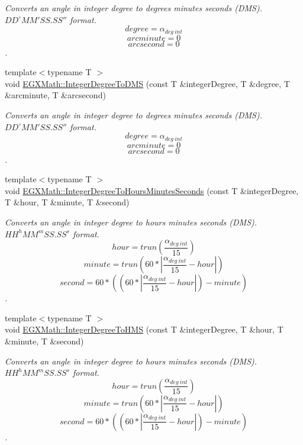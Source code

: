 \begin{DoxyCompactItemize}
\begin{DoxyCompactList}\small\item\em Converts an angle in integer degree to degrees minutes seconds (D\+MS). ${DD}^{\circ}{MM}'{SS.SS}''$ format. \[degree=\alpha_{deg\ int}\] \[arcminute= 0\] \[arcsecond= 0\]. \end{DoxyCompactList}\item 
{\footnotesize template$<$typename T $>$ }\\void \mbox{\hyperlink{group___e_g_x_math-_angle_conversions-_integer_degree_gaf76779bcc23268b41d4c3a7610d60eaf}{E\+G\+X\+Math\+::\+Integer\+Degree\+To\+D\+MS}} (const T \&integer\+Degree, T \&degree, T \&arcminute, T \&arcsecond)
\begin{DoxyCompactList}\small\item\em Converts an angle in integer degree to degrees minutes seconds (D\+MS). ${DD}^{\circ}{MM}'{SS.SS}''$ format. \[degree=\alpha_{deg\ int}\] \[arcminute= 0\] \[arcsecond= 0\]. \end{DoxyCompactList}\item 
{\footnotesize template$<$typename T $>$ }\\void \mbox{\hyperlink{group___e_g_x_math-_angle_conversions-_integer_degree_gaaac96728b305fd8ed024843f4e92fd08}{E\+G\+X\+Math\+::\+Integer\+Degree\+To\+Hours\+Minutes\+Seconds}} (const T \&integer\+Degree, T \&hour, T \&minute, T \&second)
\begin{DoxyCompactList}\small\item\em Converts an angle in integer degree to hours minutes seconds (D\+MS). ${HH}^{h}{MM}^{m}{SS.SS}^{s}$ format. \[hour=trun(\frac{\alpha_{deg\ int}}{15})\] \[minute=trun(60 * |\frac{\alpha_{deg\ int}}{15} - hour|)\] \[second=60 * ((60 * |\frac{\alpha_{deg\ int}}{15} - hour|)-minute)\]. \end{DoxyCompactList}\item 
{\footnotesize template$<$typename T $>$ }\\void \mbox{\hyperlink{group___e_g_x_math-_angle_conversions-_integer_degree_gae6b79bd5a92f8c6942b9fc2c50695e6a}{E\+G\+X\+Math\+::\+Integer\+Degree\+To\+H\+MS}} (const T \&integer\+Degree, T \&hour, T \&minute, T \&second)
\begin{DoxyCompactList}\small\item\em Converts an angle in integer degree to hours minutes seconds (D\+MS). ${HH}^{h}{MM}^{m}{SS.SS}^{s}$ format. \[hour=trun(\frac{\alpha_{deg\ int}}{15})\] \[minute=trun(60 * |\frac{\alpha_{deg\ int}}{15} - hour|)\] \[second=60 * ((60 * |\frac{\alpha_{deg\ int}}{15} - hour|)-minute)\]. \end{DoxyCompactList}\item 

\end{DoxyCompactItemize}
